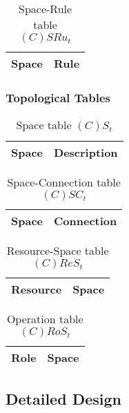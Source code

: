 \begin{table}[H]
	\centering
	\begin{tabular}{|p{4cm}|p{8cm}|}
			\hline
			\textbf{Space} & \textbf{Rule} \\
			\hline
		\end{tabular}
	\caption{Space-Rule table $(C)SRu_t$}
	\label{tab:cot}
\end{table}

\subsubsection*{Topological Tables}

\begin{table}[H]
	\centering
	\begin{tabular}{|p{4cm}|p{8cm}|}
			\hline
			\textbf{Space} & \textbf{Description} \\
			\hline
		\end{tabular}
	\caption{Space table $(C)S_t$}
	\label{tab:st}
\end{table}

\begin{table}[H]
	\centering
	\begin{tabular}{|p{4cm}|p{8cm}|}
			\hline
			\textbf{Space} & \textbf{Connection} \\
			\hline
		\end{tabular}
	\caption{Space-Connection table $(C)SC_t$}
	\label{tab:sct}
\end{table}

\begin{table}[H]
	\centering
	\begin{tabular}{|p{4cm}|p{8cm}|}
			\hline
			\textbf{Resource} & \textbf{Space} \\
			\hline
		\end{tabular}
	\caption{Resource-Space table $(C)ReS_t$}
	\label{tab:crest}
\end{table}

\begin{table}[H]
	\centering
	\begin{tabular}{|p{4cm}|p{8cm}|}
			\hline
			\textbf{Role} & \textbf{Space} \\
			\hline
		\end{tabular}
	\caption{Operation table $(C)RoS_t$}
	\label{tab:cot}
\end{table}


\subsection{Detailed Design}








































